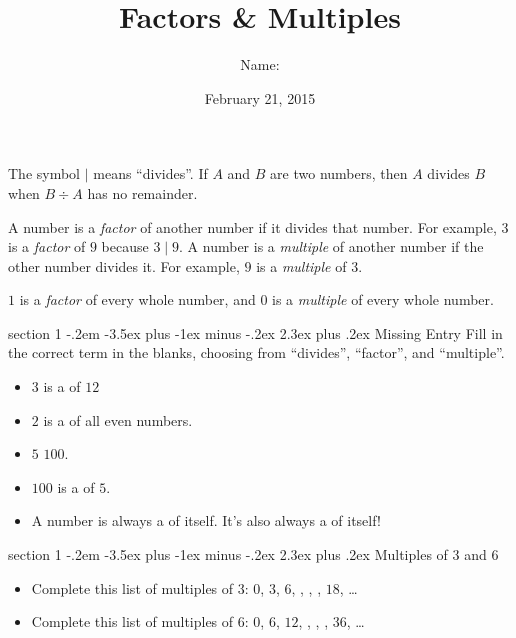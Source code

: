 \documentclass[12pt,letterpaper]{article}
\title{Factors \& Multiples}
\author{Name: \underline{\hspace{5cm}}}
\date{February 21, 2015}
\makeatletter
\newenvironment{problem}{\@startsection
       {section}
       {1}
       {-.2em}
       {-3.5ex plus -1ex minus -.2ex}
       {2.3ex plus .2ex}
       {\pagebreak[3]
       \large\bf\noindent{Problem }
       }
       }
\makeatother
\begin{document}
\maketitle

\thispagestyle{empty}

The symbol $\mid$ means ``divides''. If $A$ and $B$ are
two numbers, then $A$ divides $B$ when $B \div A$ has
no remainder.

A number is a \emph{factor} of another number if it divides
that number. For example, $3$ is a \emph{factor} of $9$
because $3 \mid 9$. A number is a \emph{multiple} of
another number if the other number divides it. For example,
$9$ is a \emph{multiple} of $3$.

$1$ is a \emph{factor} of every whole number, and $0$ is
a \emph{multiple} of every whole number.

\begin{problem}{Missing Entry}
Fill in the correct term in the blanks, choosing from
``divides'', ``factor'', and ``multiple''.

\begin{itemize}
 \item $3$ is a \underline{\hspace{10em}} of $12$
 \item $2$ is a \underline{\hspace{10em}} of all even
 numbers.
 \item $5$ \underline{\hspace{10em}} $100$.
 \item $100$ is a \underline{\hspace{10em}} of $5$.
 \item A number is always a \underline{\hspace{10em}} of
 itself. It's also always a \underline{\hspace{10em}} of
 itself!
\end{itemize}
\end{problem}

\begin{problem}{Multiples of $3$ and $6$}

 \begin{itemize}
  \item 
 Complete this list of multiples of $3$: 
 $0$, $3$, $6$, \underline{\hspace{2em}},
 \underline{\hspace{2em}}, \underline{\hspace{2em}},
 $18$, \ldots

 \item
 Complete this list of multiples of $6$: 
 $0$, $6$, $12$, \underline{\hspace{2em}},
 \underline{\hspace{2em}}, \underline{\hspace{2em}},
 $36$, \ldots
 \end{itemize}
\end{problem}
\end{document}
